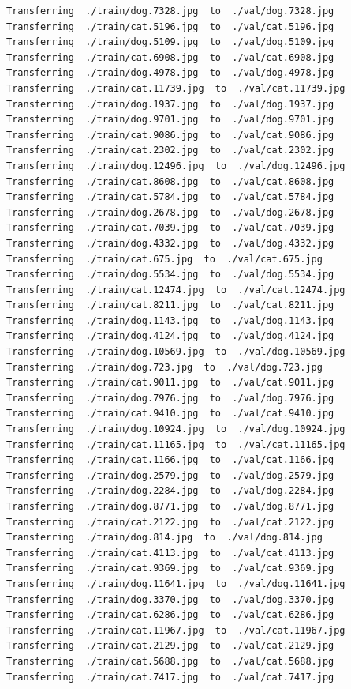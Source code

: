 \documentclass[]{book}
\theoremstyle{definition}
\theoremstyle{definition}
\theoremstyle{definition}
\theoremstyle{remark}
\begin{document}
\begin{verbatim}
Transferring  ./train/dog.7328.jpg  to  ./val/dog.7328.jpg
Transferring  ./train/cat.5196.jpg  to  ./val/cat.5196.jpg
Transferring  ./train/dog.5109.jpg  to  ./val/dog.5109.jpg
Transferring  ./train/cat.6908.jpg  to  ./val/cat.6908.jpg
Transferring  ./train/dog.4978.jpg  to  ./val/dog.4978.jpg
Transferring  ./train/cat.11739.jpg  to  ./val/cat.11739.jpg
Transferring  ./train/dog.1937.jpg  to  ./val/dog.1937.jpg
Transferring  ./train/dog.9701.jpg  to  ./val/dog.9701.jpg
Transferring  ./train/cat.9086.jpg  to  ./val/cat.9086.jpg
Transferring  ./train/cat.2302.jpg  to  ./val/cat.2302.jpg
Transferring  ./train/dog.12496.jpg  to  ./val/dog.12496.jpg
Transferring  ./train/cat.8608.jpg  to  ./val/cat.8608.jpg
Transferring  ./train/cat.5784.jpg  to  ./val/cat.5784.jpg
Transferring  ./train/dog.2678.jpg  to  ./val/dog.2678.jpg
Transferring  ./train/cat.7039.jpg  to  ./val/cat.7039.jpg
Transferring  ./train/dog.4332.jpg  to  ./val/dog.4332.jpg
Transferring  ./train/cat.675.jpg  to  ./val/cat.675.jpg
Transferring  ./train/dog.5534.jpg  to  ./val/dog.5534.jpg
Transferring  ./train/cat.12474.jpg  to  ./val/cat.12474.jpg
Transferring  ./train/cat.8211.jpg  to  ./val/cat.8211.jpg
Transferring  ./train/dog.1143.jpg  to  ./val/dog.1143.jpg
Transferring  ./train/dog.4124.jpg  to  ./val/dog.4124.jpg
Transferring  ./train/dog.10569.jpg  to  ./val/dog.10569.jpg
Transferring  ./train/dog.723.jpg  to  ./val/dog.723.jpg
Transferring  ./train/cat.9011.jpg  to  ./val/cat.9011.jpg
Transferring  ./train/dog.7976.jpg  to  ./val/dog.7976.jpg
Transferring  ./train/cat.9410.jpg  to  ./val/cat.9410.jpg
Transferring  ./train/dog.10924.jpg  to  ./val/dog.10924.jpg
Transferring  ./train/cat.11165.jpg  to  ./val/cat.11165.jpg
Transferring  ./train/cat.1166.jpg  to  ./val/cat.1166.jpg
Transferring  ./train/dog.2579.jpg  to  ./val/dog.2579.jpg
Transferring  ./train/dog.2284.jpg  to  ./val/dog.2284.jpg
Transferring  ./train/dog.8771.jpg  to  ./val/dog.8771.jpg
Transferring  ./train/cat.2122.jpg  to  ./val/cat.2122.jpg
Transferring  ./train/dog.814.jpg  to  ./val/dog.814.jpg
Transferring  ./train/cat.4113.jpg  to  ./val/cat.4113.jpg
Transferring  ./train/cat.9369.jpg  to  ./val/cat.9369.jpg
Transferring  ./train/dog.11641.jpg  to  ./val/dog.11641.jpg
Transferring  ./train/dog.3370.jpg  to  ./val/dog.3370.jpg
Transferring  ./train/cat.6286.jpg  to  ./val/cat.6286.jpg
Transferring  ./train/cat.11967.jpg  to  ./val/cat.11967.jpg
Transferring  ./train/cat.2129.jpg  to  ./val/cat.2129.jpg
Transferring  ./train/cat.5688.jpg  to  ./val/cat.5688.jpg
Transferring  ./train/cat.7417.jpg  to  ./val/cat.7417.jpg

\end{verbatim}
\end{document}
